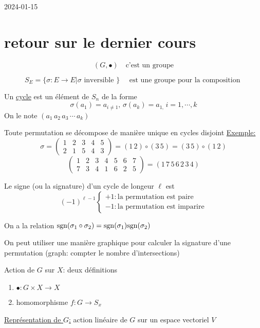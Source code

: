 


2024-01-15

\section*{retour sur le dernier cours}
\[ (G, \bullet) \quad \text{c'est un groupe} \]

\[ S_E = \{ \sigma: E \to E | \sigma \text{ inversible }  \}  \quad \text{ est une groupe pour la composition } \]


Un \underline{cycle} est un élément de $S_n$ de la forme \[ \sigma(a_1 ) = a_{i\neq1},\, \sigma(a_{k}) = a_{1,\,} i = 1, \dotsb, k \] 
On le note $(a_1 \, a_2 \, a_3 \, \dotsb\, a_k)$

\begin{tcolorbox}[title=Fait important]
	Toute permutation se décompose de manière unique en cycles disjoint 
	\underline{Exemple:}
	\[ \sigma = \begin{pmatrix} 1 & 2 &3 &4 &5 \\ 2 & 1 &5 &4 &3 \end{pmatrix} = (1\, 2) \circ (3\, 5) = (3\, 5) \circ (1\, 2) \]
	\[ \begin{pmatrix} 1 & 2 & 3 &4 &5 &6 &7\\ 7 &3 &4&1 &6 &2 &5 \end{pmatrix}  = (1\, 7\, 5\,6\,2\,3\,4) \]
\end{tcolorbox}


Le signe (ou la signature) d'un cycle de longeur $\ell$ est \[ 	(-1)^{\ell -1} \begin{cases} +1: \text{la permutation est paire}\\ -1: \text{la permutation est imparire}  	
\end{cases}\]


On a la relation $\rm{sgn}(\sigma_1 \circ \sigma_{2}) = \rm{sgn}(\sigma_1 ) \rm{sgn}(\sigma_2 )$

On peut utiliser une manière graphique pour calculer la signature d'une permutation (graph: compter le nombre d'intersections)

Action de $G$ sur $X$: deux définitions 

\begin{enumerate}
	\item $\bullet: G \times X\to X $
	\item homomorphisme $f: G \to S_x$
\end{enumerate}

\underline{Représentation de $G$:} action linéaire de $G$ sur un espace vectoriel $V$ 

